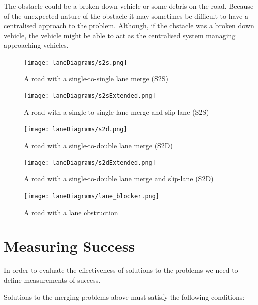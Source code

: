 The obstacle could be a broken down vehicle or some debris on the road. Because of the unexpected nature of the obstacle it may sometimes be difficult to have a centralised approach to the problem. Although, if the obstacle was a broken down vehicle, the vehicle might be able to act as the centralised system managing approaching vehicles.

\begin{figure}[htb]
\texttt{[image: laneDiagrams/s2s.png]}
\caption{A road with a single-to-single lane merge (S2S)}
\label{fig:S2SMerge}
\end{figure}

\begin{figure}[htb]
\texttt{[image: laneDiagrams/s2sExtended.png]}
\caption{A road with a single-to-single lane merge and slip-lane (S2S)}
\label{fig:S2SMergeExtended}
\end{figure}

\begin{figure}[htb]
\texttt{[image: laneDiagrams/s2d.png]}
\caption{A road with a single-to-double lane merge (S2D)}
\label{fig:S2DMerge}
\end{figure}

\begin{figure}[htb]
\texttt{[image: laneDiagrams/s2dExtended.png]}
\caption{A road with a single-to{}-double lane merge and slip-lane (S2D)}
\label{fig:S2DMergeExtended}
\end{figure}

\begin{figure}[htb]
\texttt{[image: laneDiagrams/lane\_blocker.png]}
\caption{A road with a lane obstruction}
\label{fig:LaneObstruction}
\end{figure}

\section{Measuring Success}
\label{sec:Measuring Success}
In order to evaluate the effectiveness of solutions to the problems we need to define measurements of success. 

Solutions to the merging problems above must satisfy the following conditions:


